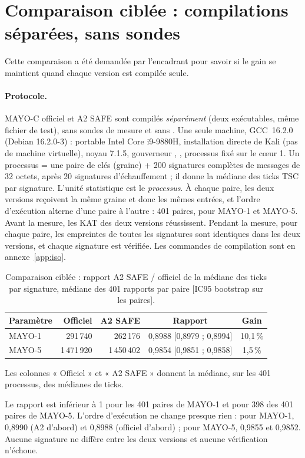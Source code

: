 \section[Comparaison ciblée]{Comparaison ciblée : compilations séparées, sans sondes}\label{sec:iso}
Cette comparaison a été demandée par l'encadrant pour savoir si le gain se maintient quand chaque version est compilée seule.
\paragraph{Protocole.} MAYO-C officiel et A2 SAFE sont compilés \emph{séparément} (deux exécutables, même fichier de test), sans sondes de mesure et sans . Une seule machine, GCC~16.2.0 (Debian 16.2.0-3) : portable Intel Core i9-9880H, installation directe de Kali (pas de machine virtuelle), noyau 7.1.5, gouverneur , , processus fixé sur le cœur 1. Un processus = une paire de clés (graine) + 200 signatures complètes de messages de 32 octets, après 20 signatures d'échauffement ; il donne la médiane des ticks TSC par signature. L'unité statistique est le \emph{processus}. À chaque paire, les deux versions reçoivent la même graine et donc les mêmes entrées, et l'ordre d'exécution alterne d'une paire à l'autre : 401 paires, pour MAYO-1 et MAYO-5. Avant la mesure, les KAT des deux versions réussissent. Pendant la mesure, pour chaque paire, les empreintes de toutes les signatures sont identiques dans les deux versions, et chaque signature est vérifiée. Les commandes de compilation sont en annexe~\ref{app:iso}.
\begin{table}[ht]\centering\small
\caption{Comparaison ciblée : rapport A2 SAFE / officiel de la médiane des ticks par signature, médiane des 401 rapports par paire [IC95 bootstrap sur les paires].}\label{tab:iso}
\begin{tabular}{@{}lrrcc@{}}\toprule
Paramètre & Officiel & A2 SAFE & Rapport & Gain\\\midrule
MAYO-1 & 291\,740 & 262\,176 & 0,8988 [0,8979 ; 0,8994] & 10,1\,\%\\
MAYO-5 & 1\,471\,920 & 1\,450\,402 & 0,9854 [0,9851 ; 0,9858] & 1,5\,\%\\\bottomrule
\end{tabular}
\par\smallskip\footnotesize Les colonnes « Officiel » et « A2 SAFE » donnent la médiane, sur les 401 processus, des médianes de ticks.
\end{table}
\F{} Le rapport est inférieur à 1 pour les 401 paires de MAYO-1 et pour 398 des 401 paires de MAYO-5. L'ordre d'exécution ne change presque rien : pour MAYO-1, 0,8990 (A2 d'abord) et 0,8988 (officiel d'abord) ; pour MAYO-5, 0,9855 et 0,9852. Aucune signature ne diffère entre les deux versions et aucune vérification n'échoue.
